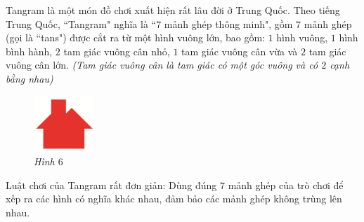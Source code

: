 	\vspace*{-5pt}
	\begin{multicols}{2}
		Tangram là một món đồ chơi xuất hiện rất lâu đời ở Trung Quốc. Theo tiếng Trung Quốc, ``Tangram" nghĩa là ``$7$ mảnh ghép thông minh", gồm $7$ mảnh ghép (gọi là ``tans") được cắt ra từ một hình vuông lớn, bao gồm: $1$ hình vuông, $1$ hình bình hành, $2$ tam giác vuông cân nhỏ, $1$ tam giác vuông cân vừa và $2$ tam giác vuông cân lớn.
		\vskip 0.1cm
		\textit{\small (Tam giác vuông cân là tam giác có một góc vuông và có $2$ cạnh bằng nhau)}
		\begin{figure}[H]
			\vspace*{-20pt}	
			\captionsetup{labelformat=empty}
			\centering
			\captionsetup{justification=raggedleft}
			\includegraphics[width =0.2\textwidth]{image6}
			\caption{\small\it Hình $6$}
		\end{figure}
	\end{multicols}
	\vspace*{-5pt}
	Luật chơi của Tangram rất đơn giản: Dùng đúng $7$ mảnh ghép của trò chơi để xếp ra các hình có nghĩa khác nhau, đảm bảo các mảnh ghép không trùng lên nhau.
	\vspace*{-5pt}
